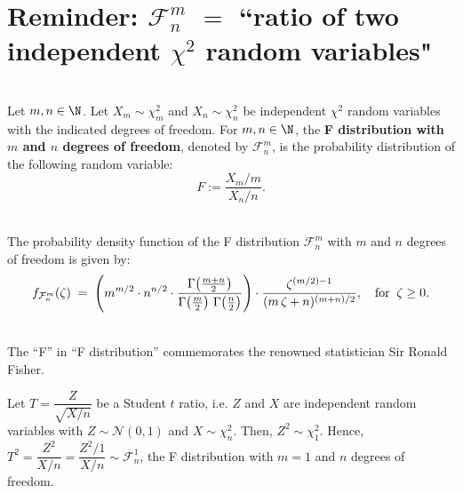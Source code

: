 \documentclass{article}
\begin{document}

\section{Reminder: $\mathcal{F}^{m}_{n}$ \;$=$\; ``ratio of two independent $\chi^{2}$ random variables"}
\setcounter{theorem}{0}

\begin{definition}\mbox{}\\
Let $m,n \in \N$.  Let $X_{m} \sim \chi^{2}_{m}$ and $X_{n} \sim \chi^{2}_{n}$ be independent $\chi^{2}$ random variables with the indicated degrees of freedom.  For $m, n \in \N$, the \textbf{F distribution with $m$ and $n$ degrees of freedom}, denoted by $\mathcal{F}^{m}_{n}$, is the probability distribution of the following random variable:
\begin{equation*}
F := \dfrac{X_{m}/m}{X_{n}/n}.
\end{equation*}
\end{definition}

\begin{theorem}\label{pdf:Fmn}\mbox{}\\
The probability density function of the F distribution $\mathcal{F}^{m}_{n}$ with $m$ and $n$ degrees of freedom is given by:
\begin{equation*}
         f_{\mathcal{F}^{m}_{n}}\!\left(\zeta\right)
\; = \; \left(
         m^{m/2} \cdot n^{n/2}\cdot
         \dfrac{\Gamma\!\left(\frac{m+n}{2}\right)}{\Gamma\!\left(\frac{m}{2}\right)\,\Gamma\!\left(\frac{n}{2}\right)}
         \right)\cdot
         \dfrac{\zeta^{(m/2)-1}}{(m\,\zeta + n)^{(m+n)/2}},
\quad\textnormal{for}\;\; \zeta \geq 0.
\end{equation*}
\end{theorem}

\begin{remark}\mbox{}\\
The ``F'' in ``F distribution'' commemorates the renowned statistician Sir Ronald Fisher. \vskip 0.1cm

\noindent
Let $T = \dfrac{Z}{\sqrt{X/n}}$ be a Student $t$ ratio, i.e. $Z$ and $X$ are independent random variables with $Z \sim \mathcal{N}(0,1)$ and $X \sim \chi^{2}_{n}$.  Then, $Z^{2} \sim \chi^{2}_{1}$.  Hence, $T^{2} = \dfrac{Z^{2}}{X/n} = \dfrac{Z^{2}/1}{X/n} \sim \mathcal{F}^{1}_{n}$, the F distribution with $m=1$ and $n$ degrees of freedom. 
\end{remark}
\end{document}
